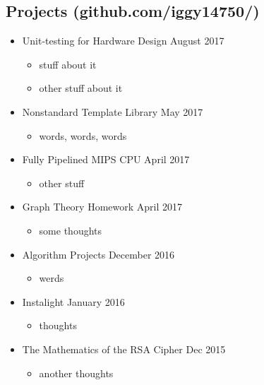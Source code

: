 \documentclass[18pt]{article}
\providecommand{\tightlist}{
    \setlength{\itemsep}{0pt}\setlength{\parskip}{0pt}
}
\begin{document}
  \subsection*{Projects (github.com/iggy14750/)}\label{projects}
    \begin{itemize}\tightlist
        
      \item Unit-testing for Hardware Design \textbar{} August 2017
      \begin{itemize}\tightlist
        \item stuff about it
        \item other stuff about it
      \end{itemize}
        
      \item Nonstandard Template Library \textbar{} May 2017
      \begin{itemize}\tightlist
        \item words, words, words
      \end{itemize}
          
      \item Fully Pipelined MIPS CPU \textbar{} April 2017
      \begin{itemize}\tightlist
        \item other stuff
      \end{itemize}
      
      \item Graph Theory Homework \textbar{} April 2017
      \begin{itemize}\tightlist
        \item some thoughts
      \end{itemize}
      
      \item Algorithm Projects \textbar{} December 2016
        \begin{itemize}\tightlist
          \item werds
        \end{itemize}
        
      \item Instalight \textbar{} January 2016
      \begin{itemize}\tightlist
        \item thoughts
      \end{itemize}
      
      \item The Mathematics of the RSA Cipher \textbar{} Dec 2015
      \begin{itemize}\tightlist
        \item another thoughts
      \end{itemize}
  \end{itemize}
    
\end{document}
